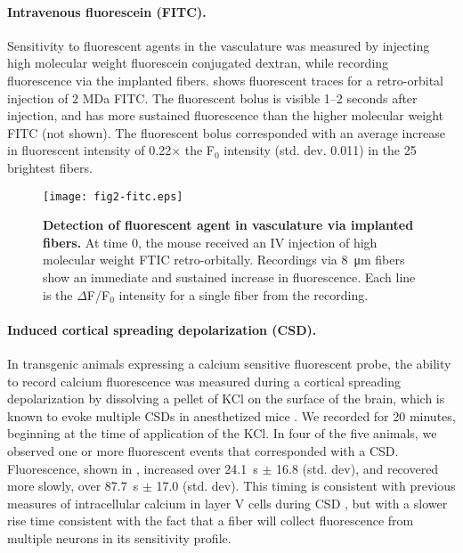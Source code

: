 \paragraph{Intravenous fluorescein (FITC).} Sensitivity to fluorescent agents in 
the vasculature was measured by injecting high molecular weight 
fluorescein conjugated dextran, while recording fluorescence via the 
implanted fibers.  shows fluorescent traces for a retro-orbital 
injection of 2 MDa FITC. The fluorescent bolus is visible 1--2 seconds
 after injection, and has more sustained fluorescence than the higher 
molecular weight FITC (not shown). The fluorescent bolus corresponded 
with an average increase in fluorescent intensity of 0.22$\times$ the 
F$_0$ intensity (std. dev. 0.011) in the 25 brightest fibers.

\begin{figure}
\texttt{[image: fig2-fitc.eps]}
\caption[Recording of FITC in vasculature]{\textbf{Detection of fluorescent agent in vasculature via implanted fibers.} At
 time 0, the mouse received an IV injection of high molecular weight 
FTIC retro-orbitally. Recordings via 8~\si{\micro\meter} fibers show 
an immediate and sustained increase in fluorescence. Each line is the 
$\Delta$F/F$_0$ intensity for a single fiber from the recording.}
\label{fig:iv-fitc}
\end{figure}

\paragraph{Induced cortical spreading depolarization (CSD).} In 
transgenic animals 
expressing a calcium sensitive fluorescent probe, the ability to 
record calcium fluorescence was measured during a cortical spreading 
depolarization by dissolving a pellet of KCl on the surface of the 
brain, which is known to evoke multiple CSDs in anesthetized mice 
\cite{Karatas:2013ir}. We recorded for 20 minutes, beginning at the 
time of application of the KCl. In four of the five animals, we 
observed one or more fluorescent events that corresponded with a CSD. 
Fluorescence, shown in , increased over 24.1~s $\pm$ 16.8 (std.
 dev), and recovered more slowly, over 87.7~s $\pm$ 17.0 (std. dev). 
This timing is consistent with previous measures of intracellular 
calcium in layer V cells during CSD \cite{Gniel:2010jn}, but with a 
slower rise time consistent with the fact that a fiber will collect 
fluorescence from multiple neurons in its sensitivity profile.

